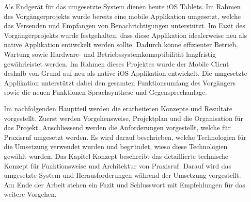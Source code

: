 Als Endgerät für das umgesetzte System dienen heute iOS Tablets.
Im Rahmen des Vorgängerprojekts wurde bereits eine mobile Applikation umgesetzt, welche das Versenden und Empfangen von Benachrichtigungen unterstützt.
Im Fazit des Vorgängerprojekts wurde festgehalten, dass diese Applikation idealerweise neu als native Applikation entiwckelt werden sollte.
Dadurch könne effizienter Betrieb, Wartung sowie Hardware- und Betriebssystemkomaptibilität langfristig gewährleistet werden.\cite{ip5}
Im Rahmen dieses Projektes wurde der Mobile Client deshalb von Grund auf neu als native iOS Applikation entwickelt.
Die umgesetzte Applikation unterstützt dabei den gesamten Funktionsumfang des Vorgängers sowie die neuen Funktionen Sprachsynthese und Gegensprechanlage.

Im nachfolgenden Hauptteil werden die erarbeiteten Konzepte und Resultate vorgestellt.
Zuerst werden Vorgehensweise, Projektplan und die Organisation für das Projekt.
Anschliessend werden die Anforderungen vorgestellt, welche für Praxisruf umgesetzt werden.
Es wird darauf beschrieben, welche Technologien für die Umsetzung verwendet wurden und begründet, wieso diese Technologien gewählt wurden.
Das Kapitel Konzept beschreibt das detaillierte technische Konzept für Funktionsweise und Architektur von Praxisruf.
Darauf wird das umgesetzte System und Herausforderungen während der Umsetzung vorgestellt.
Am Ende der Arbeit stehen ein Fazit und Schlusswort mit Empfehlungen für das weitere Vorgehen.

\clearpage
